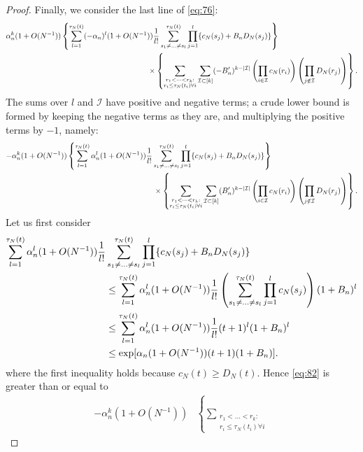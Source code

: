 \documentclass{article}
\newcommand{\1}[1]{\mathbbm{1}_{#1}}
\begin{document}
\begin{proof}
Finally, we consider the last line of \eqref{eq:76}:
\begin{align}
\alpha_n^k (1 + O(N^{-1}) )
&\left\{ \sum_{l=1}^{\tau_N(t)} (- \alpha_n)^l (1 + O(N^{-1}) ) \frac{1}{l!}
\sum_{s_1 \neq \dots \neq s_l}^{\tau_N(t)} \prod_{j=1}^l
\{ c_N(s_j) + B_n D_N(s_j) \} \right\} \notag\\
&\hspace{4cm}\times
\left\{ \sum_{\substack{r_1 <\dots< r_k :\\ r_i \leq \tau_N(t_i) \forall i}}
\sum_{\mathcal{I} \subset [k]} (-B_n^\prime)^{k-|\mathcal{I}|}
\left( \prod_{i\in\mathcal{I}} c_N(r_i) \right)
\left( \prod_{j\notin\mathcal{I}} D_N(r_j) \right)
\right\} .
\end{align}
The sums over $l$ and $\mathcal{I}$ have positive and negative terms; a crude lower bound is formed by keeping the negative terms as they are, and multiplying the positive terms by $-1$, namely:
\begin{align}
- \alpha_n^k (1 + O(N^{-1}) )
&\left\{ \sum_{l=1}^{\tau_N(t)} \alpha_n^l (1 + O(N^{-1}) ) \frac{1}{l!}
\sum_{s_1 \neq \dots \neq s_l}^{\tau_N(t)} \prod_{j=1}^l
\{ c_N(s_j) + B_n D_N(s_j) \} \right\} \notag\\
&\hspace{4cm}\times
\left\{ \sum_{\substack{r_1 <\dots< r_k :\\ r_i \leq \tau_N(t_i) \forall i}}
\sum_{\mathcal{I} \subset [k]} (B_n^\prime)^{k-|\mathcal{I}|}
\left( \prod_{i\in\mathcal{I}} c_N(r_i) \right)
\left( \prod_{j\notin\mathcal{I}} D_N(r_j) \right)
\right\} . \label{eq:82}
\end{align}
Let us first consider
\begin{align}
\sum_{l=1}^{\tau_N(t)} \alpha_n^l (1 + O(N^{-1}) ) \frac{1}{l!}
&\sum_{s_1 \neq \dots \neq s_l}^{\tau_N(t)} \prod_{j=1}^l
\{ c_N(s_j) + B_n D_N(s_j) \} \notag\\
&\leq \sum_{l=1}^{\tau_N(t)} \alpha_n^l (1 + O(N^{-1}) ) \frac{1}{l!}
\left( \sum_{s_1 \neq \dots \neq s_l}^{\tau_N(t)} \prod_{j=1}^l c_N(s_j) \right) (1+B_n)^l \notag\\
&\leq \sum_{l=1}^{\tau_N(t)} \alpha_n^l (1 + O(N^{-1}) ) \frac{1}{l!}
(t+1)^l (1+B_n)^l \notag\\
&\leq \exp[ \alpha_n (1 + O(N^{-1}) ) (t+1) (1+B_n) ].
\end{align}
where the first inequality holds because $c_N(t) \geq D_N(t)$.
Hence \eqref{eq:82} is greater than or equal to
\begin{align}
- \alpha_n^k (1 + O(N^{-1}) )
&\left\{ \sum_{\substack{r_1 <\dots< r_k :\\ r_i \leq \tau_N(t_i) \forall i}}

\end{align}
\end{proof}
\end{document}
